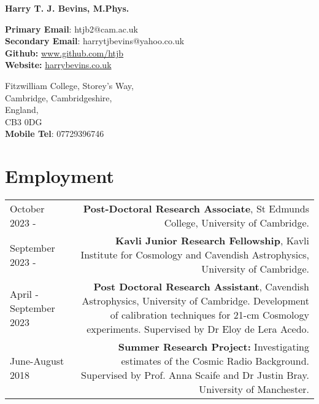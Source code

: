 \documentclass{article}
\begin{document}
\small

\begin{center}
\huge
\textbf{Harry T. J. Bevins, M.Phys.}
\end{center}

\begin{minipage}[ht]{0.6\linewidth}
	\textbf{Primary Email}: htjb2@cam.ac.uk \\
	\textbf{Secondary Email}: harrytjbevins@yahoo.co.uk \\
	\textbf{Github:} \url{www.github.com/htjb}\\
	\textbf{Website:} \url{harrybevins.co.uk}
\end{minipage}
\begin{minipage}[ht]{0.3\linewidth}
	\begin{flushright}
	Fitzwilliam College, Storey's Way,\\
	Cambridge, Cambridgeshire,\\
	England,\\
	CB3 0DG \\
    \textbf{Mobile Tel}: 07729396746 \\
	\end{flushright}
\end{minipage}

\section*{Employment}
\begin{tabular}{L!{\vrule}R}
    October 2023 - & \textbf{Post-Doctoral Research Associate}, St Edmunds College, University of Cambridge. \\
    September 2023 - & \textbf{Kavli Junior Research Fellowship}, Kavli Institute for Cosmology and Cavendish Astrophysics, University of Cambridge. \\
    April - September 2023 & \textbf{Post Doctoral Research Assistant}, Cavendish Astrophysics, University of Cambridge. Development of calibration techniques for 21-cm Cosmology experiments. Supervised by Dr Eloy de Lera Acedo.\\
    June-August 2018 & \textbf{Summer Research Project:} Investigating estimates of the Cosmic Radio Background. Supervised by Prof. Anna Scaife and Dr Justin Bray. University of Manchester. \\
\end{tabular}
\end{document}
